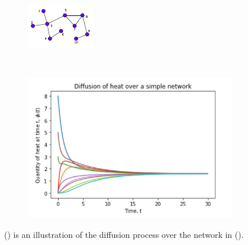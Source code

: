 \documentclass[10pt,a4paper]{article}
\begin{document}
	\begin{figure}[!h]
		\centering
		\begin{subfigure}[b]{0.29\textwidth}
			\includegraphics[width=\textwidth]{images/diffusion-graph.pdf}
			\caption{}
			\label{difn-graph}
		\end{subfigure}~
		\begin{subfigure}[b]{0.45\textwidth}
			\includegraphics[width= \textwidth]{images/simple-quantity-time.png}
			\caption{}
			\label{difn-plot}
		\end{subfigure}
		\caption{() is an illustration of the diffusion process over the network in (). }
		\label{graph-plot}
	\end{figure}

\end{document}
